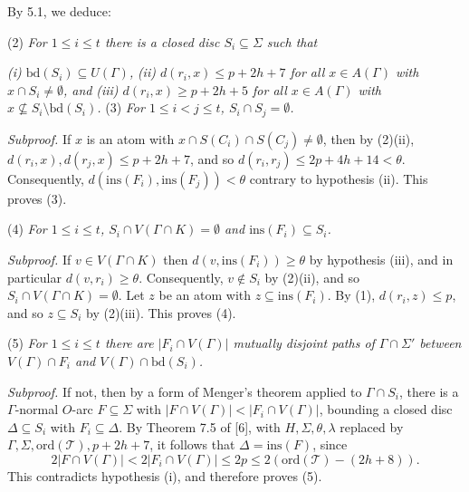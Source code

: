 By 5.1, we deduce:

\hspace*{12pt}(2) \textit{For $1 \le i \le t$ there is a closed disc $S_i \subseteq \Sigma$ such that}

\textit{(i) $\text{bd}(S_i) \subseteq U(\Gamma)$,} \textit{(ii) $d(r_i, x) \le p + 2h + 7$ for all $x \in A(\Gamma)$ with $x \cap S_i \ne \emptyset$, and} \textit{(iii) $d(r_i, x) \ge p + 2h + 5$ for all $x \in A(\Gamma)$ with $x \nsubseteq S_i \setminus \text{bd}(S_i)$.} (3) \textit{For $1 \le i < j \le t$, $S_i \cap S_j = \emptyset$.}

\textit{Subproof.} If $x$ is an atom with $x \cap S(C_i) \cap S(C_j) \ne \emptyset$, then by (2)(ii), $d(r_i, x), d(r_j, x) \le p + 2h + 7$, and so $d(r_i, r_j) \le 2p + 4h + 14 < \theta$. Consequently, $d(\text{ins}(F_i), \text{ins}(F_j)) < \theta$ contrary to hypothesis (ii). This proves (3).

\hspace*{12pt}(4) \textit{For $1 \le i \le t$, $S_i \cap V(\Gamma \cap K) = \emptyset$ and $\text{ins}(F_i) \subseteq S_i$.}

\textit{Subproof.} If $v \in V(\Gamma \cap K)$ then $d(v, \text{ins}(F_i)) \ge \theta$ by hypothesis (iii), and in particular $d(v, r_i) \ge \theta$. Consequently, $v \notin S_i$ by (2)(ii), and so $S_i \cap V(\Gamma \cap K) = \emptyset$. Let $z$ be an atom with $z \subseteq \text{ins}(F_i)$. By (1), $d(r_i, z) \le p$, and so $z \subseteq S_i$ by (2)(iii). This proves (4).

\hspace*{12pt}(5) \textit{For $1 \le i \le t$ there are $|F_i \cap V(\Gamma)|$ mutually disjoint paths of $\Gamma \cap \Sigma'$ between $V(\Gamma) \cap F_i$ and $V(\Gamma) \cap \text{bd}(S_i)$.}

\textit{Subproof.} If not, then by a form of Menger's theorem applied to $\Gamma \cap S_i$, there is a $\Gamma$-normal $O$-arc $F \subseteq \Sigma$ with $|F \cap V(\Gamma)| < |F_i \cap V(\Gamma)|$, bounding a closed disc $\Delta \subseteq S_i$ with $F_i \subseteq \Delta$. By Theorem 7.5 of [6], with $H, \Sigma, \theta, \lambda$ replaced by $\Gamma, \Sigma, \text{ord}(\mathcal{T}), p + 2h + 7$, it follows that $\Delta = \text{ins}(F)$, since
\begin{equation*}
2|F \cap V(\Gamma)| < 2|F_i \cap V(\Gamma)| \le 2p \le 2(\text{ord}(\mathcal{T}) - (2h + 8)).
\end{equation*}
This contradicts hypothesis (i), and therefore proves (5).

